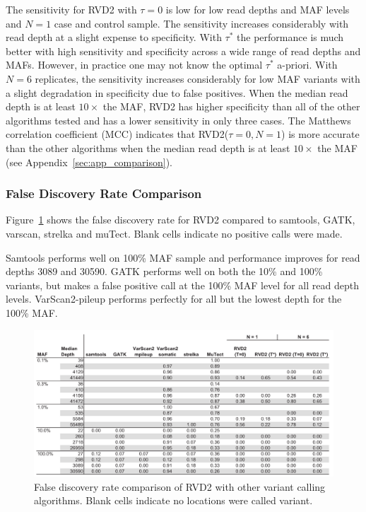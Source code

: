 \documentclass[11pt,reqno]{amsart}
\begin{document}
The sensitivity for RVD2 with $\tau=0$ is low for low read depths and MAF levels and $N=1$ case and control sample. The sensitivity increases considerably with read depth at a slight expense to specificity. With $\tau^*$ the performance is much better with high sensitivity and specificity across a wide range of read depths and MAFs. However, in practice one may not know the optimal $\tau^*$ a-priori. With $N=6$ replicates, the sensitivity increases considerably for low MAF variants with a slight degradation in specificity due to false positives. When the median read depth is at least $10\times$ the MAF, RVD2 has higher specificity than all of the other algorithms tested and has a lower sensitivity in only three cases. The Matthews correlation coefficient (MCC) indicates that RVD2($\tau=0, N=1$) is more accurate than the other algorithms when the median read depth is at least $10\times$ the MAF (see Appendix~\ref{sec:app_comparison}).

\subsubsection*{False Discovery Rate Comparison}
Figure~\ref{tbl:comparison_fdr} shows the false discovery rate for RVD2 compared to samtools, GATK, varscan, strelka and muTect. Blank cells indicate no positive calls were made.

Samtools performs well on 100\% MAF sample and performance improves for read depths 3089 and 30590. GATK performs well on both the 10\% and 100\% variants, but makes a false positive call at the 100\% MAF level for all read depth levels. VarScan2-pileup performs perfectly for all but the lowest depth for the 100\% MAF.

\begin{figure}[h]
\begin{center}
\includegraphics[width=160mm]{pdf_figs/comparison_table_fdr.pdf}
\caption{False discovery rate comparison of RVD2 with other variant calling algorithms. Blank cells indicate no locations were called variant.}
\label{tbl:comparison_fdr}
\end{center}
\end{figure}
\end{document}
